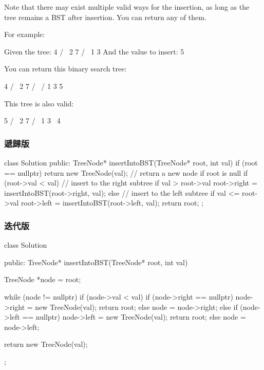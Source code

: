 Note that there may exist multiple valid ways for the insertion, as long as the tree remains a BST after insertion. You can return any of them.

For example:
\begin{Code}
Given the tree:
        4
       / \
      2   7
     / \
    1   3
And the value to insert: 5
\end{Code}

You can return this binary search tree:
\begin{Code}
         4
       /   \
      2     7
     / \   /
    1   3 5
\end{Code}

This tree is also valid:
\begin{Code}
         5
       /   \
      2     7
     / \   
    1   3
         \
          4
\end{Code}


\subsubsection{遞歸版}
\begin{Code}
class Solution {
public:
    TreeNode* insertIntoBST(TreeNode* root, int val) {
        if (root == nullptr) {
            return new TreeNode(val);   // return a new node if root is null
        }
        if (root->val < val) {           // insert to the right subtree if val > root->val
            root->right = insertIntoBST(root->right, val);
        } else {                        // insert to the left subtree if val <= root->val
            root->left = insertIntoBST(root->left, val);
        }
        return root;
    }
};
\end{Code}

\subsubsection{迭代版}
\begin{Code}
class Solution {
public:
    TreeNode* insertIntoBST(TreeNode* root, int val) {
        TreeNode *node = root;

        while (node != nullptr)
        {
            if (node->val < val)
            {
                if (node->right == nullptr)
                {
                    node->right = new TreeNode(val);
                    return root;
                }
                else
                    node = node->right;
            }
            else
            {
                if (node->left == nullptr)
                {
                    node->left = new TreeNode(val);
                    return root;
                }
                else
                    node = node->left;
            }
        }

        return new TreeNode(val);
    }
};
\end{Code}

